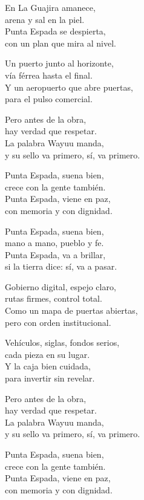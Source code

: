 \begin{lyrics}
En La Guajira amanece,\\
arena y sal en la piel.\\
Punta Espada se despierta,\\
con un plan que mira al nivel.

Un puerto junto al horizonte,\\
vía férrea hasta el final.\\
Y un aeropuerto que abre puertas,\\
para el pulso comercial.

Pero antes de la obra,\\
hay verdad que respetar.\\
La palabra Wayuu manda,\\
y su sello va primero, sí, va primero.

Punta Espada, suena bien,\\
crece con la gente también.\\
Punta Espada, viene en paz,\\
con memoria y con dignidad.

Punta Espada, suena bien,\\
mano a mano, pueblo y fe.\\
Punta Espada, va a brillar,\\
si la tierra dice: sí, va a pasar.

Gobierno digital, espejo claro,\\
rutas firmes, control total.\\
Como un mapa de puertas abiertas,\\
pero con orden institucional.

Vehículos, siglas, fondos serios,\\
cada pieza en su lugar.\\
Y la caja bien cuidada,\\
para invertir sin revelar.

Pero antes de la obra,\\
hay verdad que respetar.\\
La palabra Wayuu manda,\\
y su sello va primero, sí, va primero.

Punta Espada, suena bien,\\
crece con la gente también.\\
Punta Espada, viene en paz,\\
con memoria y con dignidad.


\end{lyrics}
